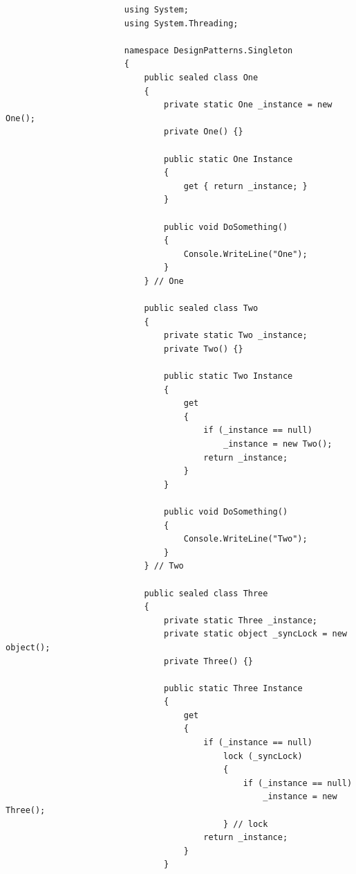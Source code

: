 \documentclass[a4paper,10pt]{article}
\begin{document}
                    \begin{lstlisting}
                        using System;
                        using System.Threading;
                        
                        namespace DesignPatterns.Singleton
                        {
                            public sealed class One
                            {
                                private static One _instance = new One();
                                private One() {}
                        
                                public static One Instance
                                {
                                    get { return _instance; }
                                }
                        
                                public void DoSomething()
                                {
                                    Console.WriteLine("One");
                                }
                            } // One
                        
                            public sealed class Two
                            {
                                private static Two _instance;
                                private Two() {}
                        
                                public static Two Instance
                                {
                                    get
                                    {
                                        if (_instance == null)
                                            _instance = new Two();
                                        return _instance;
                                    }
                                }
                        
                                public void DoSomething()
                                {
                                    Console.WriteLine("Two");
                                }
                            } // Two
                        
                            public sealed class Three
                            {
                                private static Three _instance;
                                private static object _syncLock = new object();
                                private Three() {}
                        
                                public static Three Instance
                                {
                                    get
                                    {
                                        if (_instance == null)
                                            lock (_syncLock)
                                            {
                                                if (_instance == null)
                                                    _instance = new Three();
                                            } // lock
                                        return _instance;
                                    }
                                }
                        

\end{lstlisting}
\end{document}

